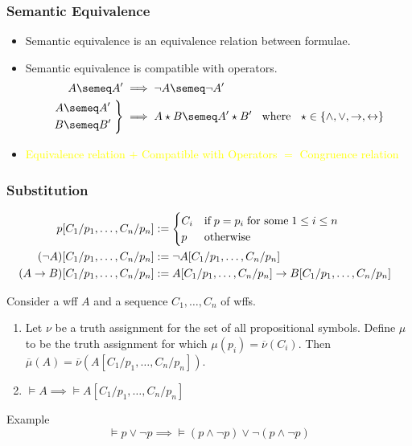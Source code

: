 \documentclass[UTF8,aspectratio=43,11pt,colorlinks,compress,openany]{beamer}%
\begin{document}
\begin{frame}\frametitle{Semantic Equivalence}
	\begin{itemize}
		\item Semantic equivalence is an equivalence relation between formulae.
		\item Semantic equivalence is compatible with operators.
\begin{align*}
A\semeq A'&\implies\neg A\semeq\neg A'\\
\left.
	\begin{aligned}
		A&\semeq A'\\
		B&\semeq B'
	\end{aligned}\;\right\}&\implies A\star B \semeq A'\star B' \;\;\mbox{ where }\;\; \star\in\{\wedge,\vee,\to,\leftrightarrow\}
\end{align*}
		\item \textcolor{yellow}{\small Equivalence relation $+$ Compatible with Operators $=$ Congruence relation}
	\end{itemize}
\end{frame}

\begin{frame}\frametitle{Substitution}\vspace*{-3ex}
	\begin{align*}
	p[C_1/p_1,\dots,C_n/p_n]&:=
	\begin{cases}
	 C_i &\text{if}\;p=p_i\;\text{for some}\;1\leq i\leq n\\
	p &\text{otherwise}
	\end{cases}\\
	(\neg A)[C_1/p_1,\dots,C_n/p_n]&:=\neg A[C_1/p_1,\dots,C_n/p_n]\\
	\hspace*{-7pt}(A\to B)[C_1/p_1,\dots,C_n/p_n]&:=A[C_1/p_1,\dots,C_n/p_n]\to B[C_1/p_1,\dots,C_n/p_n]
	\end{align*}
	\begin{theorem}
		Consider a wff $A$ and a sequence $C_1,\dots,C_n$ of wffs.
		\begin{enumerate}
			\item Let $\nu$ be a truth assignment for the set of all propositional symbols. Define $\mu$ to be the truth assignment for which $\mu(p_i)=\overline{\nu}(C_i)$. Then $\overline{\mu}(A)=\overline{\nu}\left(A[C_1/p_1,\dots,C_n/p_n]\right)$.
			\item $\vDash A\implies\vDash A[C_1/p_1,\dots,C_n/p_n]$
		\end{enumerate}
	\end{theorem}
	\begin{block}{Example}
		\[\vDash p\vee\neg p\implies\vDash(p\wedge\neg p)\vee\neg(p\wedge\neg p)\]
	\end{block}
\end{frame}
\end{document}
